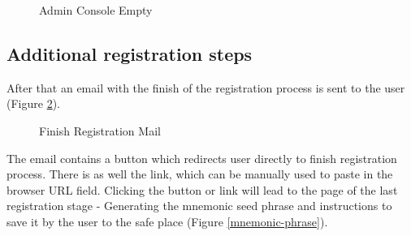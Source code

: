 \begin{figure}[H]
    \centering
    \caption{Admin Console Empty}
    \label{admin-console-empty}
\end{figure}

\subsection{Additional registration steps}

After that an email with the finish of the registration process is sent to the user (Figure \ref{finish-registration-mail}).

\begin{figure}[H]
    \centering
    \caption{Finish Registration Mail}
    \label{finish-registration-mail}
\end{figure}

The email contains a button which redirects user directly to finish registration process. There is as well the link, which can be manually used to paste in the browser URL field. Clicking the button or link will lead to the page of the last registration stage - Generating the mnemonic seed phrase and instructions to save it by the user to the safe place (Figure \ref{mnemonic-phrase}).

